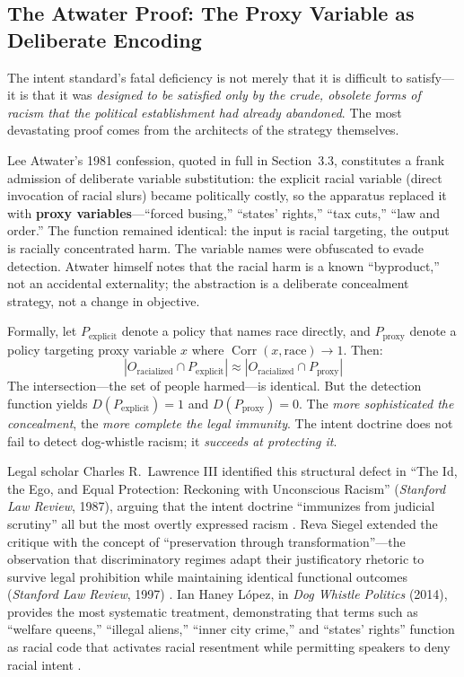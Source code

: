 \documentclass[12pt,openany]{book}
\begin{document}
\subsection{The Atwater Proof: The Proxy Variable as Deliberate Encoding}

The intent standard's fatal deficiency is not merely that it is difficult to satisfy---it is that it was \textit{designed to be satisfied only by the crude, obsolete forms of racism that the political establishment had already abandoned}. The most devastating proof comes from the architects of the strategy themselves.

Lee Atwater's 1981 confession, quoted in full in Section~3.3, constitutes a frank admission of deliberate variable substitution: the explicit racial variable (direct invocation of racial slurs) became politically costly, so the apparatus replaced it with \textbf{proxy variables}---``forced busing,'' ``states' rights,'' ``tax cuts,'' ``law and order.'' The function remained identical: the input is racial targeting, the output is racially concentrated harm. The variable names were obfuscated to evade detection. Atwater himself notes that the racial harm is a known ``byproduct,'' not an accidental externality; the abstraction is a deliberate concealment strategy, not a change in objective.

Formally, let $P_{\text{explicit}}$ denote a policy that names race directly, and $P_{\text{proxy}}$ denote a policy targeting proxy variable $x$ where $\operatorname{Corr}(x, \text{race}) \to 1$. Then:
\[
|O_{\text{racialized}} \cap P_{\text{explicit}}| \approx |O_{\text{racialized}} \cap P_{\text{proxy}}|
\]
The intersection---the set of people harmed---is identical. But the detection function yields $D(P_{\text{explicit}}) = 1$ and $D(P_{\text{proxy}}) = 0$. The \textit{more sophisticated the concealment}, the \textit{more complete the legal immunity}. The intent doctrine does not fail to detect dog-whistle racism; it \textit{succeeds at protecting it}.

Legal scholar Charles R.\ Lawrence III identified this structural defect in ``The Id, the Ego, and Equal Protection: Reckoning with Unconscious Racism'' (\textit{Stanford Law Review}, 1987), arguing that the intent doctrine ``immunizes from judicial scrutiny'' all but the most overtly expressed racism \cite{tel_lawrence}. Reva Siegel extended the critique with the concept of ``preservation through transformation''---the observation that discriminatory regimes adapt their justificatory rhetoric to survive legal prohibition while maintaining identical functional outcomes (\textit{Stanford Law Review}, 1997) \cite{tel_siegel}. Ian Haney L\'{o}pez, in \textit{Dog Whistle Politics} (2014), provides the most systematic treatment, demonstrating that terms such as ``welfare queens,'' ``illegal aliens,'' ``inner city crime,'' and ``states' rights'' function as racial code that activates racial resentment while permitting speakers to deny racial intent \cite{lopez}.
\end{document}

